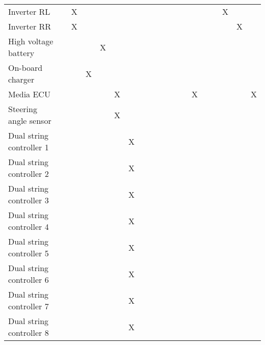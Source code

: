 \begin{table}[htb]
{\begin{tabular}{lllllllllllllllllll}
    \textcolor{mint}{Inverter RL}                &   & X &   &   &   &   &   &   &   &   &   & \multicolumn{1}{c|}{}  &   &   &   & X &   &   \\
    \rowcolor[gray]{0.925}
    \textcolor{mint}{Inverter RR}                &   & X &   &   &   &   &   &   &   &   &   & \multicolumn{1}{c|}{}  &   &   &   &   & X &   \\
    High voltage battery                         &   &   &   & X &   &   &   &   &   &   &   & \multicolumn{1}{c|}{}  &   &   &   &   &   &   \\
    \rowcolor[gray]{0.925}
    On-board charger                             &   &   & X &   &   &   &   &   &   &   &   & \multicolumn{1}{c|}{}  &   &   &   &   &   &   \\
    \textcolor{mint}{Media ECU}                  &   &   &   &   & X &   &   &   &   &   &   & \multicolumn{1}{c|}{}  & X &   &   &   &   & X \\
    \rowcolor[gray]{0.925}
    Steering angle sensor                        &   &   &   &   & X &   &   &   &   &   &   & \multicolumn{1}{c|}{}  &   &   &   &   &   &   \\
    \textcolor{mint}{Dual string controller 1}   &   &   &   &   &   & X &   &   &   &   &   & \multicolumn{1}{c|}{}  &   &   &   &   &   &   \\
    \rowcolor[gray]{0.925}
    \textcolor{mint}{Dual string controller 2}   &   &   &   &   &   & X &   &   &   &   &   & \multicolumn{1}{c|}{}  &   &   &   &   &   &   \\
    \textcolor{mint}{Dual string controller 3}   &   &   &   &   &   & X &   &   &   &   &   & \multicolumn{1}{c|}{}  &   &   &   &   &   &   \\
    \rowcolor[gray]{0.925}
    \textcolor{mint}{Dual string controller 4}   &   &   &   &   &   & X &   &   &   &   &   & \multicolumn{1}{c|}{}  &   &   &   &   &   &   \\
    \textcolor{mint}{Dual string controller 5}   &   &   &   &   &   & X &   &   &   &   &   & \multicolumn{1}{c|}{}  &   &   &   &   &   &   \\
    \rowcolor[gray]{0.925}
    \textcolor{mint}{Dual string controller 6}   &   &   &   &   &   & X &   &   &   &   &   & \multicolumn{1}{c|}{}  &   &   &   &   &   &   \\
    \textcolor{mint}{Dual string controller 7}   &   &   &   &   &   & X &   &   &   &   &   & \multicolumn{1}{c|}{}  &   &   &   &   &   &   \\
    \rowcolor[gray]{0.925}
    \textcolor{mint}{Dual string controller 8}   &   &   &   &   &   & X &   &   &   &   &   & \multicolumn{1}{c|}{}  &   &   &   &   &   &   \\

\end{tabular}}
\end{table}
